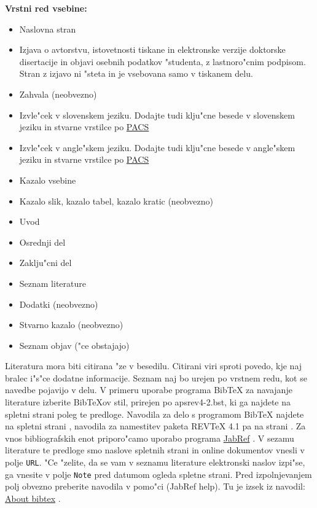 {\bf Vrstni red vsebine:}

\begin{itemize}[noitemsep]
\item{Naslovna stran}
\item{Izjava o avtorstvu, istovetnosti tiskane in elektronske verzije doktorske disertacije in objavi osebnih podatkov "studenta, z lastnoro"cnim podpisom. Stran z izjavo ni "steta in je vsebovana samo v tiskanem delu.}
\item{Zahvala (neobvezno)}
\item{Izvle"cek v slovenskem jeziku. Dodajte tudi klju"cne besede v slovenskem jeziku in stvarne vrstilce po  \href{http://physics.zju.edu.cn/pw/ymdm/file/pacs/pacs.html}{\ac{PACS}}}
\item{Izvle"cek v angle"skem jeziku. Dodajte tudi klju"cne besede v angle"skem jeziku in stvarne vrstilce po  \href{http://physics.zju.edu.cn/pw/ymdm/file/pacs/pacs.html}{\ac{PACS}}}
\item{Kazalo vsebine}
\item{Kazalo slik, kazalo tabel, kazalo kratic (neobvezno)}
\item{Uvod}
\item{Osrednji del}
\item{Zaklju"cni del}
\item{Seznam literature}
\item{Dodatki (neobvezno)}
\item{Stvarno kazalo (neobvezno)}
\item{Seznam objav ("ce obstajajo)}
\end{itemize}

Literatura mora biti citirana "ze v besedilu. Citirani viri sproti povedo, kje naj bralec i"s"ce dodatne informacije. 
Seznam naj bo urejen po vrstnem redu, kot se navedbe pojavijo v delu.
V primeru uporabe programa {Bib\TeX} za navajanje literature izberite Bib\TeX{ov} stil, prirejen po apsrev4-2.bst, ki ga najdete na spletni strani poleg te predloge. 
Navodila za delo s programom {Bib\TeX} najdete na spletni strani \cite{Bib}, navodila za namestitev paketa REVTeX 4.1 pa na strani \cite{Rev}. 
Za vnos bibliografskih enot priporo"camo uporabo programa \href{http://www.jabref.org/}{JabRef} \cite{JR}. 
V sezamu literature te predloge smo naslove spletnih strani in online dokumentov vnesli v polje {\tt URL}. "Ce "zelite, da se vam v seznamu literature elektronski naslov izpi"se,
ga vnesite v polje {\tt Note} pred datumom ogleda spletne strani.
Pred izpolnjevanjem polj obvezno preberite navodila v pomo"ci (JabRef help). Tu je izsek iz navodil: \href{https://help.jabref.org/en/Bibtex}{About bibtex} \cite{Help}.\\

